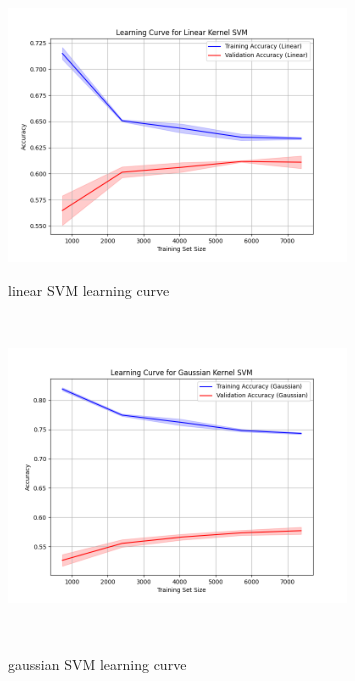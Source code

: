 \documentclass[10pt,a4paper]{article}
\begin{document}
\begin{figure}[b]
    \centering
    \begin{minipage}{0.2\textwidth}
        \centering
        \includegraphics[width=0.8\textwidth]{images/learning_curve_linear_SVM.png}
        \caption[width=0.8\linewidth]{linear SVM learning curve}
        \label{fig:linear_SVM_curve}
    \end{minipage}%
    \begin{minipage}{0.05\textwidth}
        \ 
    \end{minipage}
    \begin{minipage}{0.2\textwidth}
        \centering
        \includegraphics[width=0.8\textwidth]{images/learning_curve_gaussian_SVM.png}
        \caption[width=0.8\linewidth]{gaussian SVM learning curve}
        \label{fig:gaussian_SVM_curve}
    \end{minipage}%
    \begin{minipage}{0.05\textwidth}
        \ 
    \end{minipage}%
    \begin{minipage}{0.2\textwidth}

\end{minipage}
\end{figure}
\end{document}
